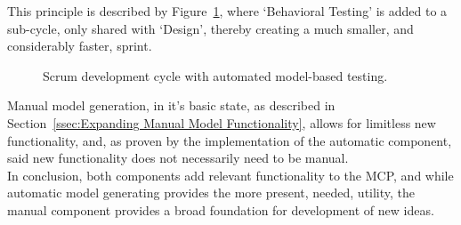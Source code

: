 This principle is described by Figure~\ref{fig:scrumSmall}, where `Behavioral Testing' is added to a sub-cycle, only shared with `Design', thereby creating a much smaller, and considerably faster, sprint.
\newpage
\begin{figure}[h]
  \centering
  \caption{Scrum development cycle with automated model-based testing.}
  \label{fig:scrumSmall}
\end{figure}

Manual model generation, in it's basic state, as described in Section~\ref{ssec:Expanding Manual Model Functionality}, allows for limitless new functionality, and, as proven by the implementation of the automatic component, said new functionality does not necessarily need to be manual.\\[0.5cm]
In conclusion, both components add relevant functionality to the MCP, and while automatic model generating provides the more present, needed, utility, the manual component provides a broad foundation for development of new ideas.

